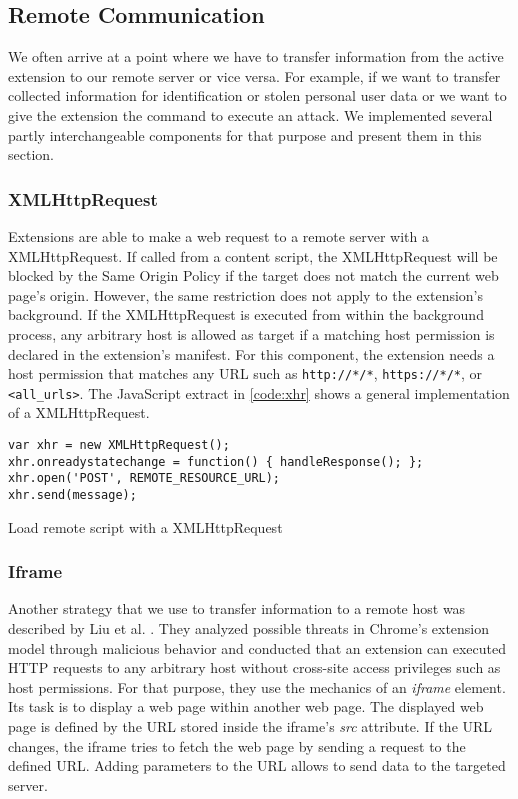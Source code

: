 \subsection{Remote Communication}
\label{sec:remoteCommunication}
	We often arrive at a point where we have to transfer information from the active extension to our remote server or vice versa. For example, if we want to transfer collected information for identification or stolen personal user data or we want to give the extension the command to execute an attack. We implemented several partly interchangeable components for that purpose and present them in this section.

\subsubsection{XMLHttpRequest}
\label{sec:xhrCommunication}

	Extensions are able to make a web request to a remote server with a XMLHttpRequest. If called from a content script, the XMLHttpRequest will be blocked by the Same Origin Policy if the target does not match the current web page's origin. However, the same restriction does not apply to the extension's background. If the XMLHttpRequest is executed from within the background process, any arbitrary host is allowed as target if a matching host permission is declared in the extension's manifest. For this component, the extension needs a host permission that matches any URL such as \texttt{http://*/*}, \texttt{https://*/*}, or \texttt{<all\_urls>}. The JavaScript extract in \autoref{code:xhr} shows a general implementation of a XMLHttpRequest. 
	
	\begin{code}
		\begin{lstlisting}
var xhr = new XMLHttpRequest();
xhr.onreadystatechange = function() { handleResponse(); };
xhr.open('POST', REMOTE_RESOURCE_URL);
xhr.send(message);
		\end{lstlisting}
		\caption{Load remote script with a XMLHttpRequest}
		\label{code:xhr}
	\end{code}

\subsubsection{Iframe}

	Another strategy that we use to transfer information to a remote host was described by Liu et al. \cite{Liu12chromeextensions:}. They analyzed possible threats in Chrome's extension model through malicious behavior and conducted that an extension can executed HTTP requests to any arbitrary host without cross-site access privileges such as host permissions. For that purpose, they use the mechanics of an \textit{iframe} element. Its task is to display a web page within another web page. The displayed web page is defined by the URL stored inside the iframe's \textit{src} attribute. If the URL changes, the iframe tries to fetch the web page by sending a request to the defined URL. Adding parameters to the URL allows to send data to the targeted server. 

